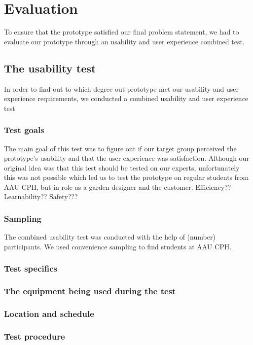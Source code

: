 \chapter{Evaluation}


To ensure that the prototype satisfied our final problem statement, we had to evaluate our prototype through an usability and user experience combined test. 

\section{The usability test}
In order to find out to which degree out prototype met our usability and user experience requirements, we conducted a combined usability and user experience test

\subsection{Test goals}
The main goal of this test was to figure out if our target group perceived the prototype's usability and that the user experience was satisfaction. Although our original idea was that this test should be tested on our experts, unfortunately this was not possible which led us to test the prototype on regular students from AAU CPH, but in role as a garden designer and the customer.
Efficiency??
Learnability??
Safety???

\subsection{Sampling}
The combined usability test was conducted with the help of (number) participants. We used convenience sampling to find students at AAU CPH.

\subsection{Test specifics}

\subsection*{The equipment being used during the test}

\subsection*{Location and schedule}

\subsection*{Test procedure}

